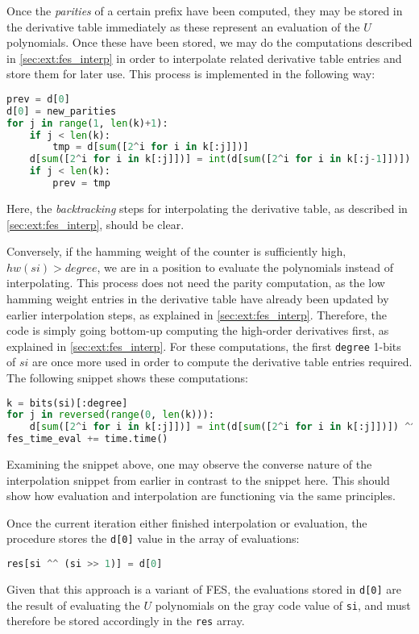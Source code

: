 Once the \textit{parities} of a certain prefix have been computed, they may be stored in the derivative table immediately as these represent an evaluation of the $U$ polynomials. Once these have been stored, we may do the computations described in \cref{sec:ext:fes_interp} in order to interpolate related derivative table entries and store them for later use. This process is implemented in the following way:
\begin{lstlisting}[language=Python,style=mystyle]
prev = d[0]
d[0] = new_parities
for j in range(1, len(k)+1):
    if j < len(k):
        tmp = d[sum([2^i for i in k[:j]])]
    d[sum([2^i for i in k[:j]])] = int(d[sum([2^i for i in k[:j-1]])]) ^^ int(prev)
    if j < len(k):
        prev = tmp
\end{lstlisting}
Here, the \textit{backtracking} steps for interpolating the derivative table, as described in \cref{sec:ext:fes_interp}, should be clear.

Conversely, if the hamming weight of the counter is sufficiently high, $hw(si) > degree$, we are in a position to evaluate the polynomials instead of interpolating. This process does not need the parity computation, as the low hamming weight entries in the derivative table have already been updated by earlier interpolation steps, as explained in \cref{sec:ext:fes_interp}. Therefore, the code is simply going bottom-up computing the high-order derivatives first, as explained in \cref{sec:ext:fes_interp}. For these computations, the first \texttt{degree} 1-bits of $si$ are once more used in order to compute the derivative table entries required. The following snippet shows these computations:
\begin{lstlisting}[language=Python,style=mystyle]
k = bits(si)[:degree]
for j in reversed(range(0, len(k))):
    d[sum([2^i for i in k[:j]])] = int(d[sum([2^i for i in k[:j]])]) ^^ int(d[sum([2^i for i in k[:j+1]])])
fes_time_eval += time.time()
\end{lstlisting}
Examining the snippet above, one may observe the converse nature of the interpolation snippet from earlier in contrast to the snippet here. This should show how evaluation and interpolation are functioning via the same principles.

Once the current iteration either finished interpolation or evaluation, the procedure stores the \texttt{d[0]} value in the array of evaluations:
\begin{lstlisting}[language=Python,style=mystyle]
res[si ^^ (si >> 1)] = d[0]
\end{lstlisting}
Given that this approach is a variant of FES, the evaluations stored in \texttt{d[0]} are the result of evaluating the $U$ polynomials on the gray code value of \texttt{si}, and must therefore be stored accordingly in the \texttt{res} array.

